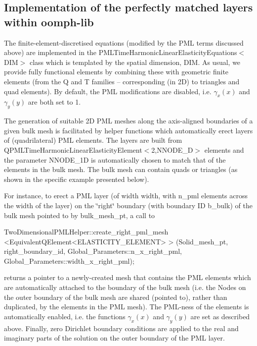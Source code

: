 \hypertarget{index_impl}{}\subsection{Implementation of the perfectly matched layers within oomph-\/lib}\label{index_impl}
The finite-\/element-\/discretised equations (modified by the P\+ML terms discussed above) are implemented in the {\ttfamily P\+M\+L\+Time\+Harmonic\+Linear\+Elasticity\+Equations$<$\+D\+I\+M$>$} class which is templated by the spatial dimension, {\ttfamily D\+IM}. As usual, we provide fully functional elements by combining these with geometric finite elements (from the Q and T families -- corresponding (in 2D) to triangles and quad elements). By default, the P\+ML modifications are disabled, i.\+e. $ \gamma_{x}(x) $ and $ \gamma_{y}(y) $ are both set to 1.

The generation of suitable 2D P\+ML meshes along the axis-\/aligned boundaries of a given bulk mesh is facilitated by helper functions which automatically erect layers of (quadrilateral) P\+ML elements. The layers are built from {\ttfamily Q\+P\+M\+L\+Time\+Harmonic\+Linear\+Elasticity\+Element$<$2,\+N\+N\+O\+D\+E\+\_\+D$>$} elements and the parameter {\ttfamily N\+N\+O\+D\+E\+\_\+1D} is automatically chosen to match that of the elements in the bulk mesh. The bulk mesh can contain quads or triangles (as shown in the specific example presented below).

For instance, to erect a P\+ML layer (of width {\ttfamily width}, with {\ttfamily n\+\_\+pml} elements across the width of the layer) on the \char`\"{}right\char`\"{} boundary (with boundary ID {\ttfamily b\+\_\+bulk}) of the bulk mesh pointed to by {\ttfamily bulk\+\_\+mesh\+\_\+pt}, a call to 
\begin{DoxyCode}
TwoDimensionalPMLHelper::create\_right\_pml\_mesh
<EquivalentQElement<ELASTICITY\_ELEMENT> >
(Solid\_mesh\_pt, right\_boundary\_id, 
Global\_Parameters::n\_x\_right\_pml, 
Global\_Parameters::width\_x\_right\_pml);
\end{DoxyCode}
 returns a pointer to a newly-\/created mesh that contains the P\+ML elements which are automatically attached to the boundary of the bulk mesh (i.\+e. the {\ttfamily Nodes} on the outer boundary of the bulk mesh are shared (pointed to), rather than duplicated, by the elements in the P\+ML mesh). The P\+M\+L-\/ness of the elements is automatically enabled, i.\+e. the functions $ \gamma_x(x) $ and $ \gamma_y(y) $ are set as described above. Finally, zero Dirichlet boundary conditions are applied to the real and imaginary parts of the solution on the outer boundary of the P\+ML layer.


